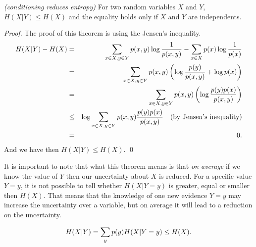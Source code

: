 \begin{theorem}
\emph{(conditioning reduces entropy)}
\label{conditioning-entropy}
For two random variables $X$ and $Y$, $H(X|Y) \leq H(X)$ and the equality holds only if $X$ and $Y$ are independents. 
\end{theorem}
\begin{proof}
The proof of this theorem is using the Jensen’s inequality.
\begin{eqnarray}
H(X|Y) - H(X) &=& \sum_{x \in X, y \in Y} p(x,y) \log \frac{1}{p(x,y)} - \sum_{x \in X} p(x) \log \frac{1}{p(x)} \nonumber \\
&=& \sum_{x \in X, y \in Y} p(x,y) \left(  \log \frac{p(y)}{p(x,y)} + \log p(x) \right) \nonumber \\
&=& \sum_{x \in X, y \in Y} p(x,y) \left( \log \frac{p(y)p(x)}{p(x,y)} \right) \nonumber \\
&\leq& \log \sum_{x \in X, y \in Y} p(x,y) \frac{p(y)p(x)}{p(x,y)} \textmd{ \ \ (by Jensen’s inequality)}\nonumber \\
&=& 0 \textmd{.}
\end{eqnarray}
And we have then $H(X|Y) \leq H(X)$. \qed
\end{proof}

\begin{remark}
It is important to note that what this theorem means is that \textit{on average} if we know the value of $Y$ then our
uncertainty about $X$ is reduced. For a specific value $Y=y$, it is not possible to tell whether $H(X|Y=y)$ is greater, 
equal or smaller then $H(X)$. That means that the knowledge of one new evidence $Y=y$ may increase the uncertainty over
a variable, but on average it will lead to a reduction on the uncertainty.

\begin{equation}
H(X|Y) = \sum_y p(y)H(X|Y=y) \leq H(X) \textmd{.}
\end{equation} 
\end{remark}




